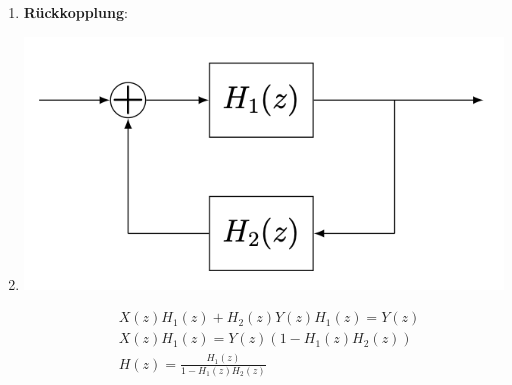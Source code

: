 \documentclass[11pt]{article}
\begin{document}
\begin{enumerate}
    \vspace*{-2.35cm}
    \item \textbf{Rückkopplung}:
    \item[] \begin{minipage}[t]{0.45\textwidth}
            \includegraphics[width=\linewidth]{docimgs/Rueckkopplung.png}
            \end{minipage}
            \hfill
            \begin{minipage}[c]{0.45\textwidth}
            \begin{align*}
                &X(z)H_1(z) + H_2(z)Y(z)H_1(z) = Y(z) \\
                &X(z)H_1(z) = Y(z)(1-H_1(z)H_2(z)) \\
                &H(z)=\frac{H_1(z)}{1-H_1(z)H_2(z)}
            \end{align*}
            \vspace*{3.45cm}
            \end{minipage}
\end{enumerate}

\vfill \null
\pagebreak
\end{document}
